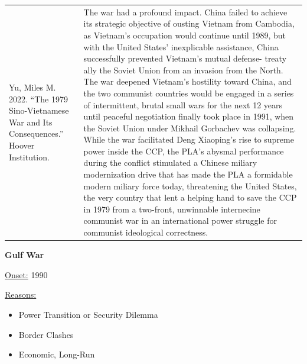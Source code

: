{\begin{longtable}{p{}p{}}
Yu, Miles M. 2022. “The 1979 Sino-Vietnamese War and Its Consequences.” Hoover Institution. & The war had a profound impact. China failed to achieve its strategic objective of ousting Vietnam from Cambodia, as Vietnam's occupation would continue until 1989, but with the United States' inexplicable assistance, China successfully prevented Vietnam's mutual defense- treaty ally the Soviet Union from an invasion from the North. The war deepened Vietnam's hostility toward China, and the two communist countries would be engaged in a series of intermittent, brutal small wars for the next 12 years until peaceful negotiation finally took place in 1991, when the Soviet Union under Mikhail Gorbachev was collapsing. While the war facilitated Deng Xiaoping's rise to supreme power inside the CCP, the PLA's abysmal performance during the conflict stimulated a Chinese miliary modernization drive that has made the PLA a formidable modern miliary force today, threatening the United States, the very country that lent a helping hand to save the CCP in 1979 from a two-front, unwinnable internecine communist war in an international power struggle for communist ideological correctness.
\\
\end{longtable}}
\clearpage
         \textbf{Gulf War} 

          \underline{Onset:} 1990         

\underline{Reasons:}
\begin{itemize}
\item Power Transition or Security Dilemma
\item Border Clashes
\item Economic, Long-Run
\end{itemize}

